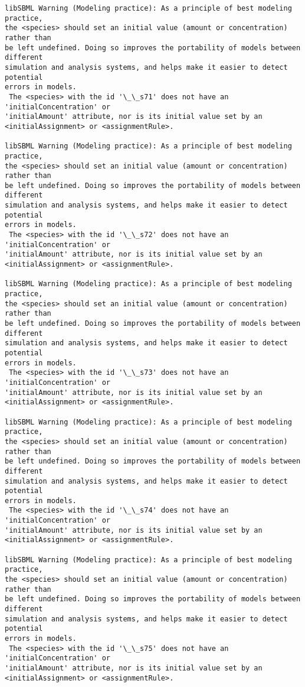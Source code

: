 \documentclass[11pt]{article}
\begin{document}
\begin{Verbatim}[commandchars=\\\{\}]
libSBML Warning (Modeling practice): As a principle of best modeling practice,
the <species> should set an initial value (amount or concentration) rather than
be left undefined. Doing so improves the portability of models between different
simulation and analysis systems, and helps make it easier to detect potential
errors in models.
 The <species> with the id '\_\_s71' does not have an 'initialConcentration' or
'initialAmount' attribute, nor is its initial value set by an
<initialAssignment> or <assignmentRule>.

libSBML Warning (Modeling practice): As a principle of best modeling practice,
the <species> should set an initial value (amount or concentration) rather than
be left undefined. Doing so improves the portability of models between different
simulation and analysis systems, and helps make it easier to detect potential
errors in models.
 The <species> with the id '\_\_s72' does not have an 'initialConcentration' or
'initialAmount' attribute, nor is its initial value set by an
<initialAssignment> or <assignmentRule>.

libSBML Warning (Modeling practice): As a principle of best modeling practice,
the <species> should set an initial value (amount or concentration) rather than
be left undefined. Doing so improves the portability of models between different
simulation and analysis systems, and helps make it easier to detect potential
errors in models.
 The <species> with the id '\_\_s73' does not have an 'initialConcentration' or
'initialAmount' attribute, nor is its initial value set by an
<initialAssignment> or <assignmentRule>.

libSBML Warning (Modeling practice): As a principle of best modeling practice,
the <species> should set an initial value (amount or concentration) rather than
be left undefined. Doing so improves the portability of models between different
simulation and analysis systems, and helps make it easier to detect potential
errors in models.
 The <species> with the id '\_\_s74' does not have an 'initialConcentration' or
'initialAmount' attribute, nor is its initial value set by an
<initialAssignment> or <assignmentRule>.

libSBML Warning (Modeling practice): As a principle of best modeling practice,
the <species> should set an initial value (amount or concentration) rather than
be left undefined. Doing so improves the portability of models between different
simulation and analysis systems, and helps make it easier to detect potential
errors in models.
 The <species> with the id '\_\_s75' does not have an 'initialConcentration' or
'initialAmount' attribute, nor is its initial value set by an
<initialAssignment> or <assignmentRule>.


\end{Verbatim}
\end{document}
